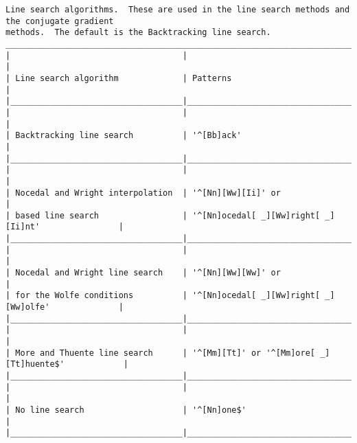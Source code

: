 \begin{verbatim}
Line search algorithms.  These are used in the line search methods and the conjugate gradient
methods.  The default is the Backtracking line search.
___________________________________________________________________________________________
|                                   |                                                     |
| Line search algorithm             | Patterns                                            |
|___________________________________|_____________________________________________________|
|                                   |                                                     |
| Backtracking line search          | '^[Bb]ack'                                          |
|___________________________________|_____________________________________________________|
|                                   |                                                     |
| Nocedal and Wright interpolation  | '^[Nn][Ww][Ii]' or                                  |
| based line search                 | '^[Nn]ocedal[ _][Ww]right[ _][Ii]nt'                |
|___________________________________|_____________________________________________________|
|                                   |                                                     |
| Nocedal and Wright line search    | '^[Nn][Ww][Ww]' or                                  |
| for the Wolfe conditions          | '^[Nn]ocedal[ _][Ww]right[ _][Ww]olfe'              |
|___________________________________|_____________________________________________________|
|                                   |                                                     |
| More and Thuente line search      | '^[Mm][Tt]' or '^[Mm]ore[ _][Tt]huente$'            |
|___________________________________|_____________________________________________________|
|                                   |                                                     |
| No line search                    | '^[Nn]one$'                                         |
|___________________________________|_____________________________________________________|




\end{verbatim}

